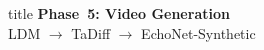 \documentclass[aspectratio=169,xcolor=dvipsnames]{beamer}
\begin{document}
\begin{frame}[plain]
    \centering
    \vfill
    \begin{beamercolorbox}[center,shadow=true,rounded=true]{title}
        \textbf{Phase~5: Video Generation}\\
        \vspace{0.5em}
        \large LDM $\to$ TaDiff $\to$ EchoNet-Synthetic
    \end{beamercolorbox}
    \vfill
\end{frame}

\end{document}
